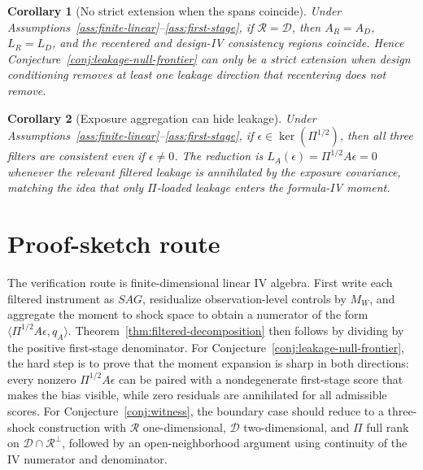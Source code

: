 \documentclass[11pt]{article}
\theoremstyle{definition}
\theoremstyle{plain}
\newtheorem{corollary}{Corollary}
\theoremstyle{remark}
\begin{document}
\begin{corollary}[No strict extension when the spans coincide]\label{cor:spans-coincide}
Under Assumptions~\ref{ass:finite-linear}--\ref{ass:first-stage}, if \(\mathcal R=\mathcal D\), then \(A_R=A_D\), \(L_R=L_D\), and the recentered and design-IV consistency regions coincide.  Hence Conjecture~\ref{conj:leakage-null-frontier} can only be a strict extension when design conditioning removes at least one leakage direction that recentering does not remove.
\end{corollary}

\begin{corollary}[Exposure aggregation can hide leakage]\label{cor:pi-null}
Under Assumptions~\ref{ass:finite-linear}--\ref{ass:first-stage}, if \(\epsilon\in\ker(\Pi^{1/2})\), then all three filters are consistent even if \(\epsilon\ne0\).  The reduction is \(L_A(\epsilon)=\Pi^{1/2}A\epsilon=0\) whenever the relevant filtered leakage is annihilated by the exposure covariance, matching the idea that only \(\Pi\)-loaded leakage enters the formula-IV moment.
\end{corollary}

\section{Proof-sketch route}
The verification route is finite-dimensional linear IV algebra.  First write each filtered instrument as \(SAG\), residualize observation-level controls by \(M_W\), and aggregate the moment to shock space to obtain a numerator of the form \(\langle \Pi^{1/2}A\epsilon,q_A\rangle\).  Theorem~\ref{thm:filtered-decomposition} then follows by dividing by the positive first-stage denominator.  For Conjecture~\ref{conj:leakage-null-frontier}, the hard step is to prove that the moment expansion is sharp in both directions: every nonzero \(\Pi^{1/2}A\epsilon\) can be paired with a nondegenerate first-stage score that makes the bias visible, while zero residuals are annihilated for all admissible scores.  For Conjecture~\ref{conj:witness}, the boundary case should reduce to a three-shock construction with \(\mathcal R\) one-dimensional, \(\mathcal D\) two-dimensional, and \(\Pi\) full rank on \(\mathcal D\cap\mathcal R^\perp\), followed by an open-neighborhood argument using continuity of the IV numerator and denominator.
\end{document}
